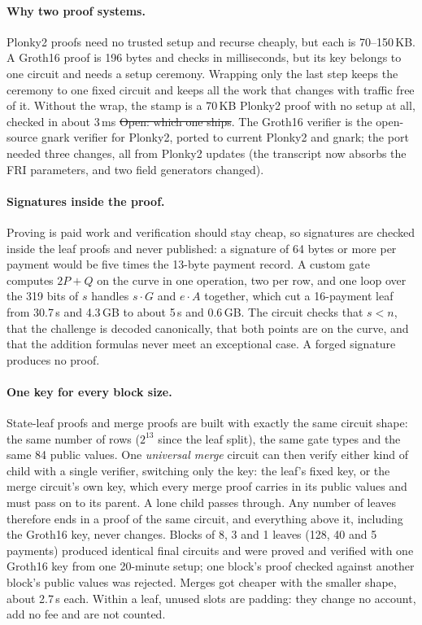 \paragraph{Why two proof systems.} Plonky2 proofs need no trusted setup and recurse cheaply, but each is 70--150\,KB. A Groth16 proof is 196 bytes and checks in milliseconds, but its key belongs to one circuit and needs a setup ceremony. Wrapping only the last step keeps the ceremony to one fixed circuit and keeps all the work that changes with traffic free of it. Without the wrap, the stamp is a 70\,KB Plonky2 proof with no setup at all, checked in about 3\,ms \st{Open: which one ships}. The Groth16 verifier is the open-source gnark verifier for Plonky2, ported to current Plonky2 and gnark; the port needed three changes, all from Plonky2 updates (the transcript now absorbs the FRI parameters, and two field generators changed).

\paragraph{Signatures inside the proof.} Proving is paid work and verification should stay cheap, so signatures are checked inside the leaf proofs and never published: a signature of 64 bytes or more per payment would be five times the 13-byte payment record. A custom gate computes $2P + Q$ on the curve in one operation, two per row, and one loop over the 319 bits of $s$ handles $s\cdot G$ and $e\cdot A$ together, which cut a 16-payment leaf from 30.7\,s and 4.3\,GB to about 5\,s and 0.6\,GB. The circuit checks that $s<n$, that the challenge is decoded canonically, that both points are on the curve, and that the addition formulas never meet an exceptional case. A forged signature produces no proof.

\paragraph{One key for every block size.} State-leaf proofs and merge proofs are built with exactly the same circuit shape: the same number of rows ($2^{13}$ since the leaf split), the same gate types and the same 84 public values. One \emph{universal merge} circuit can then verify either kind of child with a single verifier, switching only the key: the leaf's fixed key, or the merge circuit's own key, which every merge proof carries in its public values and must pass on to its parent. A lone child passes through. Any number of leaves therefore ends in a proof of the same circuit, and everything above it, including the Groth16 key, never changes. Blocks of 8, 3 and 1 leaves (128, 40 and 5 payments) produced identical final circuits and were proved and verified with one Groth16 key from one 20-minute setup; one block's proof checked against another block's public values was rejected. Merges got cheaper with the smaller shape, about 2.7\,s each. Within a leaf, unused slots are padding: they change no account, add no fee and are not counted.

